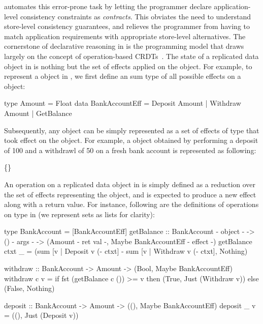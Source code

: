 \name automates this error-prone task by letting the programmer
declare application-level consistency constraints as \emph{contracts}.
This obviates the need to understand store-level consistency guarantees,
and relieves the programmer from having to match application
requirements with appropriate store-level alternatives. The
cornerstone of declarative reasoning in \name is the programming model
that draws largely on the concept of operation-based
CRDTs~\cite{shapiroCRDT}. The state of a replicated data object in
\name is nothing but the set of effects applied on the object. For
example, to represent a  object in \name, we first
define an sum type of all possible effects on a 
object:
\begin{codehaskell}
type Amount = Float
data BankAccountEff = Deposit Amount
                    | Withdraw Amount 
                    | GetBalance
\end{codehaskell}
Subsequently, any  object can be simply represented as a set of
effects of type  that took effect on the object.
For example, a  object obtained by performing a
deposit of 100 and a withdrawl of 50 on a fresh bank account is
represented as following:
\begin{center}
  \{\}
\end{center}
An operation on a replicated data object in \name is simply defined as
a reduction over the set of effects representing the object, and is
expected to produce a new effect along with a return value. For
instance, following are the definitions of operations on
 type in \name (we represent sets as lists for
clarity):
\begin{codehaskell}
type BankAccount = [BankAccountEff]
getBalance ::  BankAccount {- object -}
  -> () {- args -}
  -> (Amount {- ret val -}, 
      Maybe BankAccountEff {- effect -})
getBalance ctxt _ = (sum [v | Deposit v (- ctxt]
        - sum [v | Withdraw v (- ctxt], Nothing)

withdraw :: BankAccount -> Amount 
  -> (Bool, Maybe BankAccountEff)
withdraw c v = if fst (getBalance c ()) >= v
               then (True, Just (Withdraw v))
               else (False, Nothing)

deposit :: BankAccount -> Amount
  -> ((), Maybe BankAccountEff)
deposit _ v = ((), Just (Deposit v))
\end{codehaskell}

